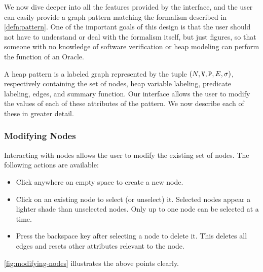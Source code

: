 We now dive deeper into all the features provided by the interface, and the user can
easily provide a graph pattern matching the formalism described in
\autoref{defn:pattern}. One of the important goals of this design is that the user
should not have to understand or deal with the formalism itself, but just figures, so
that someone with no knowledge of software verification or heap modeling can perform the
function of an Oracle.

A heap pattern is a labeled graph represented by the tuple
$(N, \mathtt{V}, \mathtt{P}, E, \sigma)$, respectively containing the set
of nodes, heap variable labeling, predicate labeling, edges, and summary function. Our
interface allows the user to modify the values of each of these attributes of the
pattern. We now describe each of these in greater detail.

\subsubsection{Modifying Nodes}
Interacting with nodes allows the user to modify the existing set of nodes. The following actions are available:
\begin{itemize}
  \item Click anywhere on empty space to create a new node.
  \item Click on an existing node to select (or unselect) it. Selected nodes appear a lighter shade than unselected nodes. Only up to one node can be selected at a time.
  \item Press the backspace key after selecting a node to delete it. This deletes all edges and resets other attributes relevant to the node.
\end{itemize}

\autoref{fig:modifying-nodes} illustrates the above points clearly.

